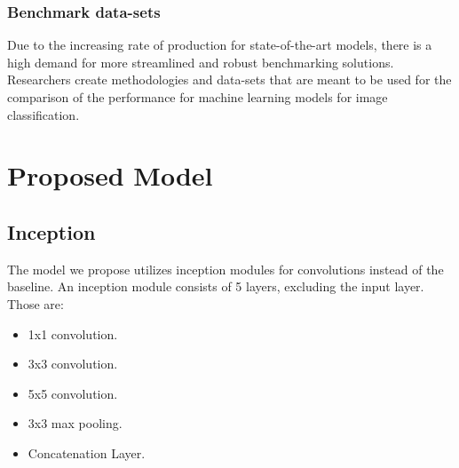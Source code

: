 \documentclass[10pt,twocolumn,letterpaper]{article}
\begin{document}
\subsubsection{Benchmark data-sets}
Due to the increasing rate of production for state-of-the-art models, there is a high demand for more streamlined and robust benchmarking solutions. Researchers \cite{lin_clear_2021} \cite{lomonaco_core50_2022} \cite{caldeira_image_2020} \cite{yellamraju_benchmarks_2018}create methodologies and data-sets that are meant to be used for the comparison of the performance for machine learning models for image classification. \cite{caldeira_image_2020}


\section{Proposed Model}
\subsection{Inception}
The model we propose utilizes inception modules for convolutions instead of the baseline. An inception module consists of 5 layers, excluding the input layer. Those are:
\begin{itemize}
    \item 1x1 convolution.
    \item 3x3 convolution.
    \item 5x5 convolution.
    \item 3x3 max pooling.
    \item Concatenation Layer.
\end{itemize}
\end{document}
